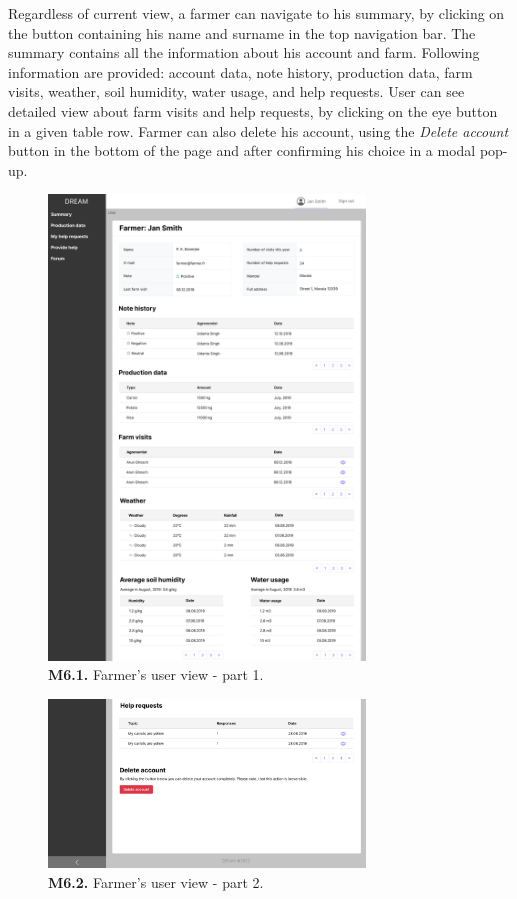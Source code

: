     Regardless of current view, a farmer can navigate to his summary, by clicking on the button containing his name and surname in the top navigation bar. The summary contains all the information about his account and farm. Following information are provided: account data, note history, production data, farm visits, weather, soil humidity, water usage, and help requests. User can see detailed view about farm visits and help requests, by clicking on the eye button in  a given table row. Farmer can also delete his account, using the \textit{Delete account} button in the bottom of the page and after confirming his choice in a modal pop-up. 
    \begin{figure}[H]
        \centering
        \includegraphics[width=0.75\textwidth]{mockups/Farmer_User_part1.png}
        \caption{\textbf{M6.1.} Farmer's user view - part 1.}
        \label{fig:farmer-summary}
    \end{figure}
    \begin{figure}[H]
        \centering
        \includegraphics[width=0.75\textwidth]{mockups/Farmer_User_part2.png}
        \caption{\textbf{M6.2.} Farmer's user view - part 2.}
    \end{figure}
    
